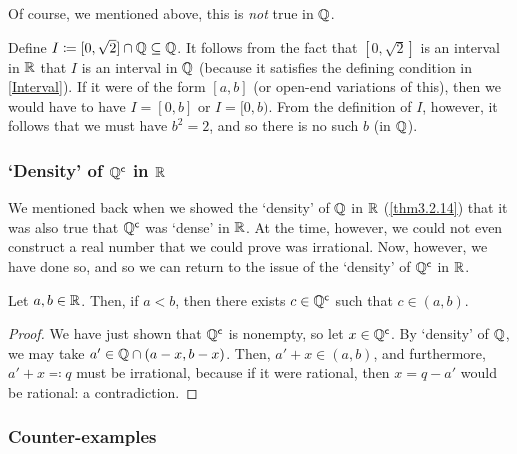 Of course, we mentioned above, this is \emph{not} true in $\mathbb{Q}$.
\begin{exm}\label{exm3.3.71}
Define $I\coloneqq [0,\sqrt{2}]\cap \mathbb{Q} \subseteq \mathbb{Q}$.  It follows from the fact  that $[0,\sqrt{2}]$ is an interval in $\mathbb{R}$ that $I$ is an interval in $\mathbb{Q}$ (because it satisfies the defining condition in \cref{Interval}).  If it were of the form $[a,b]$ (or open-end variations of this), then we would have to have $I=[0,b]$ or $I=[0,b)$.  From the definition of $I$, however, it follows that we must have $b^2=2$, and so there is no such $b$ (in $\mathbb{Q}$).
\end{exm}

\subsubsection{`Density' of $\mathbb{Q} ^{\mathsf{c}}$ in $\mathbb{R}$}

We mentioned back when we showed the `density' of $\mathbb{Q}$ in $\mathbb{R}$ (\cref{thm3.2.14}) that it was also true that $\mathbb{Q} ^{\mathsf{c}}$ was `dense' in $\mathbb{R}$.  At the time, however, we could not even construct a real number that we could prove was irrational.  Now, however, we have done so, and so we can return to the issue of the `density' of $\mathbb{Q} ^{\mathsf{c}}$ in $\mathbb{R}$.
\begin{thm}\label{thm3.3.76}
Let $a,b\in \mathbb{R}$.  Then, if $a<b$, then there exists $c\in \mathbb{Q} ^{\mathsf{c}}$ such that $c\in (a,b)$.
\begin{proof}
We have just shown that $\mathbb{Q} ^{\mathsf{c}}$ is nonempty, so let $x\in \mathbb{Q} ^{\mathsf{c}}$.  By `density' of $\mathbb{Q}$, we may take $a'\in \mathbb{Q} \cap (a-x,b-x)$.  Then, $a'+x\in (a,b)$, and furthermore, $a'+x\eqqcolon q$ must be irrational, because if it were rational, then $x=q-a'$ would be rational:  a contradiction.
\end{proof}
\end{thm}

\subsubsection{Counter-examples}

